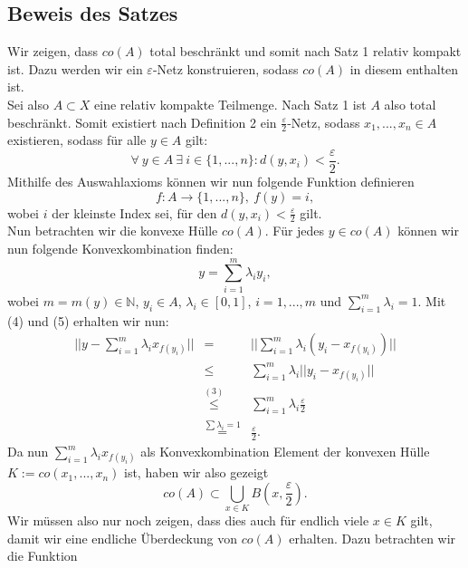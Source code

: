 \documentclass[a4paper,fontsize=8pt,DIV=1]{article}
\theoremstyle{plain}
\begin{document}
\subsection*{Beweis des Satzes}
Wir zeigen, dass $co(A)$ total beschränkt und somit nach Satz 1 relativ kompakt ist. Dazu werden wir ein $\varepsilon$-Netz konstruieren, sodass $co(A)$ in diesem enthalten ist.\\
Sei also $A \subset X$ eine relativ kompakte Teilmenge. Nach Satz 1 ist $A$ also total beschränkt. Somit existiert nach Definition 2 ein $\frac{\varepsilon}{2}$-Netz, sodass $x_1, ..., x_n \in A$ existieren, sodass für alle $y \in A$ gilt:
\begin{equation}
\forall \ y \in A \ \exists \ i \in \{1,...,n\} :  d(y, x_i) < \frac{\varepsilon}{2}.
\end{equation}
Mithilfe des Auswahlaxioms können wir nun folgende Funktion definieren
\begin{equation}
f:A\to \{1,...,n\}, \ f(y) = i,
\end{equation}
wobei $i$ der kleinste Index sei, für den $d(y, x_i) < \frac{\varepsilon}{2}$ gilt.\\
Nun betrachten wir die konvexe Hülle $co(A)$. Für jedes $y\in co(A)$ können wir nun folgende Konvexkombination finden:
\begin{equation}
y = \sum_{i = 1}^m \lambda_i y_i,
\end{equation}
wobei $m = m(y) \in \mathbb{N}$, $y_i \in A$, $\lambda_i \in [0,1]$, $i = 1,...,m$ und $\sum_{i=1}^m \lambda_i = 1$. Mit (4) und (5) erhalten wir nun:
\begin{eqnarray}
||y - \sum_{i=1}^m \lambda_i x_{f(y_i)} || &=& ||\sum_{i=1}^m \lambda_i (y_i - x_{f(y_i)} ) || \\
&\leq & \sum_{i=1}^m \lambda_i ||y_i - x_{f(y_i)}|| \\
&\stackrel{(3)}{\leq} & \sum_{i=1}^m \lambda_i \frac{\varepsilon}{2} \\
&\stackrel{\sum \lambda_i = 1}{=} & \frac{\varepsilon}{2}.
\end{eqnarray}
Da nun $\sum_{i=1}^m \lambda_i x_{f(y_i)}$ als Konvexkombination Element der konvexen Hülle $K:= co(x_1,...,x_n)$ ist, haben wir also gezeigt
\begin{equation}
co(A) \subset \bigcup_{x \in K} B(x,\frac{\varepsilon}{2}).
\end{equation}
Wir müssen also nur noch zeigen, dass dies auch für endlich viele $x \in K$ gilt, damit wir eine endliche Überdeckung von $co(A)$ erhalten. Dazu betrachten wir die Funktion
\end{document}
